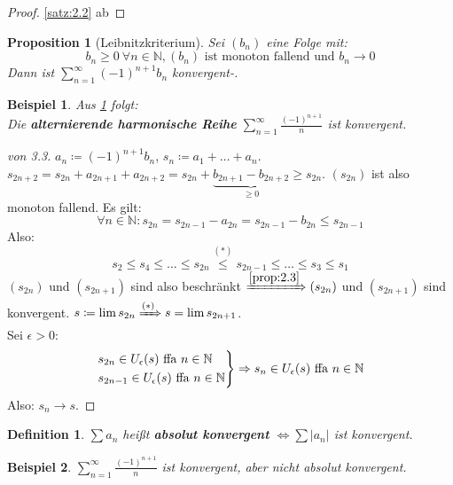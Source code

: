\documentclass[titlepage,ngerman,a4paper,headsepline,DIV15,halfparskip*,14pt]{scrartcl}
\newcommand{\N}{\mathbb{N}}
\theoremstyle{dotless}
\newtheorem{prop}[satz]{Proposition}
\newtheorem*{definition}{Definition}
\newtheorem*{beispiel*}{Beispiel}
\begin{document}
\begin{proof}
	\ref{satz:2.2} ab
\end{proof}

\begin{prop}[Leibnitzkriterium] \label{prop:3.3-leibnitzkriterium}
	Sei $(b_{n})$ eine Folge mit:
		$$ b_{n} \geq 0 ~\forall n \in \N, (b_{n}) \text{ ist monoton fallend und } b_{n} \rightarrow 0  $$
		Dann ist $\sum_{n=1}^{\infty} (-1)^{n+1}b_{n}$ konvergent-.
\end{prop}

\begin{beispiel*}
	Aus \ref{prop:3.3-leibnitzkriterium} folgt: \\
	Die \textbf{alternierende harmonische Reihe} $\sum_{n=1}^{\infty} \frac{(-1)^{n+1}}{n}$ ist konvergent.
\end{beispiel*}

\begin{proof}[von 3.3]
	$a_{n} \coloneqq (-1)^{n+1} b_{n}$, $s_{n} \coloneqq a_{1} + \dotsc + a_{n}$. $s_{2n+2} = s_{2n} + a_{2n+1} + a_{2n+2} = s_{2n} + \underbrace{b_{2n+1}-b_{2n+2}}_{\geq 0} \geq s_{2n}$. $(s_{2n})$ ist also monoton fallend. Es gilt:
	\[ \forall n \in \N: s_{2n} = s_{2n-1} - a_{2n} = s_{2n-1} - b_{2n} \leq s_{2n-1} \tag*{$(*)$} \]
	Also:
	$$ s_{2} \leq s_{4} \leq \dotsc \leq s_{2n} \overset{(*)}{\leq} s_{2n-1} \leq \dotsc \leq s_{3} \leq s_{1} $$
	$(s_{2n})$ und $(s_{2n+1})$ sind also beschränkt $\xRightarrow[]{\ref{prop:2.3}} (s_{2n})$ und $(s_{2n+1})$ sind konvergent. $s \coloneqq \lim s_{2n} \xRightarrow[]{(*)} s = \lim s_{2n+1}$. \\
	Sei $\epsilon > 0$:
	$$
		\begin{rcases*}
	 		s_{2n} \in U_{\epsilon}(s) \text{ ffa } n \in \N \\
	 		s_{2n-1} \in U_{\epsilon}(s) \text{ ffa } n \in \N  	
		\end{rcases*} \Rightarrow s_{n} \in U_{\epsilon}(s) \text{ ffa } n \in \N
	$$
	Also: $s_{n} \rightarrow s$.
\end{proof}

\begin{definition}
	$\sum a_{n}$ hei{\ss}t \textbf{absolut konvergent} $\iff \sum |a_{n}|$ ist konvergent.
\end{definition}


\begin{beispiel*}
	$\sum_{n=1}^{\infty} \frac{(-1)^{n+1}}{n}$ ist konvergent, aber nicht absolut konvergent.
\end{beispiel*}
\end{document}
